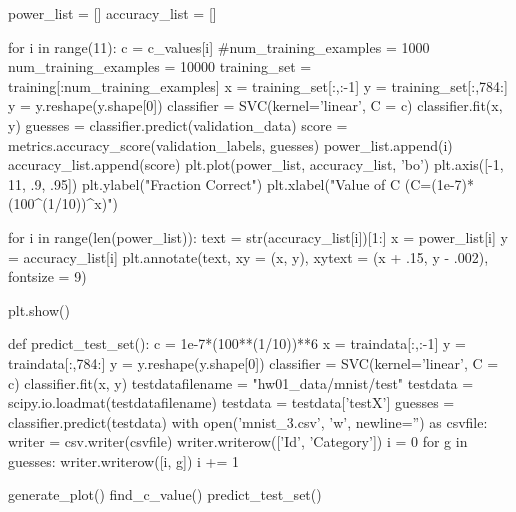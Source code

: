 \documentclass[11pt]{article}
\begin{document}
\begin{python}
    power_list = []
    accuracy_list = []

    for i in range(11):
        c = c_values[i]
        #num_training_examples = 1000
        num_training_examples = 10000
        training_set = training[:num_training_examples]
        x = training_set[:,:-1]
        y = training_set[:,784:]
        y = y.reshape(y.shape[0])
        classifier = SVC(kernel='linear', C = c)
        classifier.fit(x, y)
        guesses = classifier.predict(validation_data)
        score = metrics.accuracy_score(validation_labels, guesses)
        power_list.append(i)
        accuracy_list.append(score)
    plt.plot(power_list, accuracy_list, 'bo')
    plt.axis([-1, 11, .9, .95])
    plt.ylabel("Fraction Correct")
    plt.xlabel("Value of C (C=(1e-7)*(100^(1/10))^x)")

    for i in range(len(power_list)):
        text = str(accuracy_list[i])[1:]
        x = power_list[i]
        y = accuracy_list[i]
        plt.annotate(text, xy = (x, y), xytext = (x + .15, y - .002), fontsize = 9)

    plt.show()

def predict_test_set():
    c = 1e-7*(100**(1/10))**6
    x = traindata[:,:-1]
    y = traindata[:,784:]
    y = y.reshape(y.shape[0])
    classifier = SVC(kernel='linear', C = c)
    classifier.fit(x, y)
    testdatafilename = "hw01_data/mnist/test"
    testdata = scipy.io.loadmat(testdatafilename)
    testdata = testdata['testX']
    guesses = classifier.predict(testdata)
    with open('mnist_3.csv', 'w', newline='') as csvfile:
        writer = csv.writer(csvfile)
        writer.writerow(['Id', 'Category'])
        i = 0
        for g in guesses:
            writer.writerow([i, g])
            i += 1

generate_plot()
find_c_value()
predict_test_set()

\end{python}
\end{document}
